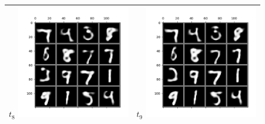 \documentclass{scrartcl}
\begin{document}
\begin{table}
\begin{tabular}{cc}
$t_8$ \includegraphics[width=140pt]{new_8.png} & $t_9$ \includegraphics[width=140pt]{new_9.png}\\
\hline
\end{tabular}
\end{table}




\end{document}
